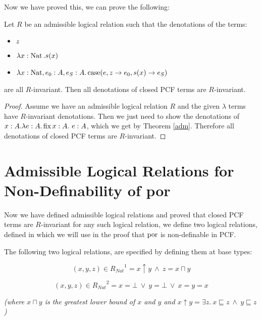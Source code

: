 
Now we have proved this, we can prove the following:

\vspace{0.5cm}

\begin{thm}{\citep{Streicher06}}
Let $R$ be an admissible logical relation such that the denotations of the terms:

\begin{itemize}
\item{$z$}
\item{$\lambda x: \operatorname{Nat}. s(x)$}
\item{$\lambda x: \operatorname{Nat}, e_0 : A, e_S: A. \operatorname{case}(e,z \to e_0,s(x) \to e_S)$}
\end{itemize}

are all $R$-invariant. Then all denotations of closed PCF terms are $R$-invariant.
\end{thm}

\begin{proof}
Assume we have an admissible logical relation $R$ and the given $\lambda$ terms have $R$-invariant denotations. Then we just need to show the denotations of $x : A. \lambda e : A. \operatorname{fix} x : A. \ e : A$, which we get by Theorem \ref{adm}. Therefore all denotations of closed PCF terms are $R$-invariant.
\end{proof}

\section{Admissible Logical Relations for Non-Definability of por}\label{exercise}

Now we have defined admissible logical relations and proved that closed PCF terms are $R$-invariant for any such logical relation, we define two logical relations, defined in \citep{Streicher06} which we will use in the proof that $\operatorname{por}$ is non-definable in PCF.

The following two logical relations, are specified by defining them at base types:

\[ (x,y,z) \in {R_{Nat}}^1 = x \uparrow y \ \wedge \ z = x \sqcap y\]

\[ (x,y,z) \in {R_{Nat}}^2 = x = \bot \ \vee \ y = \bot \ \vee \ x=y=x \]

\emph{(where $x \sqcap y$ is the greatest lower bound of $x$ and $y$ and $x \uparrow y = \exists z. \ x \sqsubseteq z \ \wedge \ y \sqsubseteq z$)}

